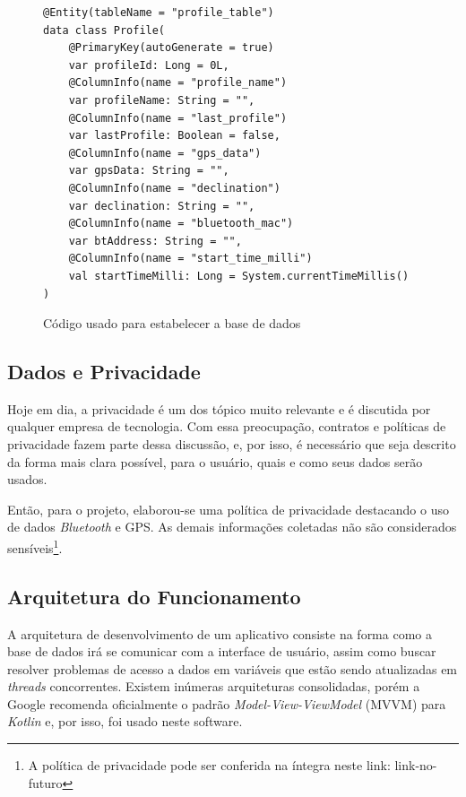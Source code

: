 \begin{figure}[htb]
	\centering
	\caption{Código usado para estabelecer a base de dados}
	\vspace{-15pt}
\begin{verbatim}
@Entity(tableName = "profile_table")
data class Profile(
	@PrimaryKey(autoGenerate = true)
	var profileId: Long = 0L,
	@ColumnInfo(name = "profile_name")
	var profileName: String = "",
	@ColumnInfo(name = "last_profile")
	var lastProfile: Boolean = false,
	@ColumnInfo(name = "gps_data")
	var gpsData: String = "",
	@ColumnInfo(name = "declination")
	var declination: String = "",
	@ColumnInfo(name = "bluetooth_mac")
	var btAddress: String = "",
	@ColumnInfo(name = "start_time_milli")
	val startTimeMilli: Long = System.currentTimeMillis()
)
\end{verbatim}

\label{code:database}
	\vspace{-20pt}
\end{figure}


\subsection{Dados e Privacidade}

Hoje em dia, a privacidade é um dos tópico muito relevante e é discutida por qualquer empresa de tecnologia. Com essa preocupação, contratos e políticas de privacidade fazem parte dessa discussão, e, por isso, é necessário que seja descrito da forma mais clara possível, para o usuário, quais e como seus dados serão usados.

Então, para o projeto, elaborou-se uma política de privacidade destacando o uso de dados \textit{Bluetooth} e GPS. As demais informações coletadas não são considerados sensíveis\footnote{A política de privacidade pode ser conferida na íntegra neste link: link-no-futuro}.

\subsection{Arquitetura do Funcionamento}

A arquitetura de desenvolvimento de um aplicativo consiste na forma como a base de dados irá se comunicar com a interface de usuário, assim como buscar resolver problemas de acesso a dados em variáveis que estão sendo atualizadas em \textit{threads} concorrentes. Existem inúmeras arquiteturas consolidadas, porém a Google recomenda oficialmente o padrão \textit{Model-View-ViewModel} (MVVM) para \textit{Kotlin} e, por isso, foi usado neste software.

